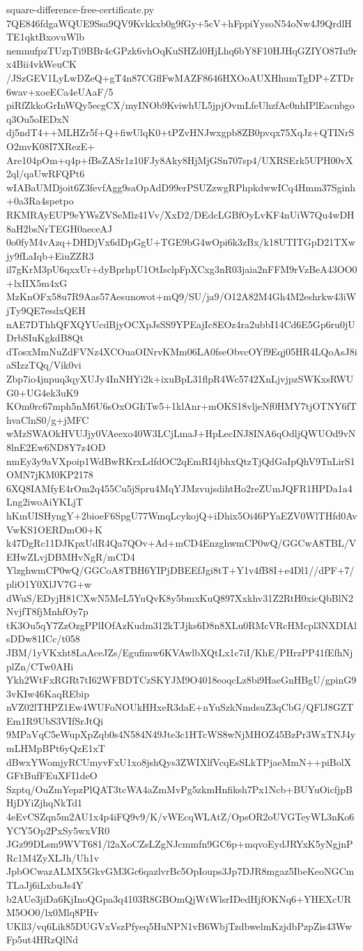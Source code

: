 \documentclass[11pt]{article}
\theoremstyle{definition}
\theoremstyle{remark}
\begin{document}
\begin{filecontents*}[overwrite]{square-difference-free-certificate.py}
7QE846fdgaWQUE9Ssa9QV9Kvkkxb0g9fGy+5cV+hFppiYysoN54oNw4J9QrdlHTE1qktBxovuWlb
nemnufpzTUzpTi9BBr4cGPzk6vhOqKuSHZd0HjLhq6bY8F10HJHqGZIYO87Iu9rx4Bii4vkWeuCK
/JSzGEV1LyLwDZeQ+gT4n87CGflFwMAZF8646HXOoAUXHhumTgDP+ZTDr6wav+xoeECa4eUAaF/5
piRfZkkoGrInWQy5ecgCX/myINOb9KviwhUL5jpjOvmLfeUhzfAc0nhIPlEacnbgoq3Ou5oIEDxN
dj5ndT4++MLHZr5f+Q+fiwUlqK0+tPZvHNJwxgpb8ZB0pvqx75XqJz+QTINrSO2mvK08I7XRezE+
Are104pOm+q4p+fBsZASr1z10FJy8Aky8HjMjGSn707sp4/UXRSErk5UPH00vX2ql/qaUwRFQPt6
wIABaUMDjoit6Z3fevfAgg9saOpAdD99erPSUZzwgRPhpkdwwICq4Hmm37Sginh+0a3Ra4spetpo
RKMRAyEUP9eYWsZVSeMlz41Vv/XxD2/DEdcLGBfOyLvKF4nUiW7Qu4wDH8aH2bsNrTEGH0aeceAJ
0o0fyM4vAzq+DHDjVx6dDpGgU+TGE9bG4wOpi6k3zBx/k18UTITGpD21TXwjy9fLaIqb+EiuZZR3
il7gKrM3pU6qxxUr+dyBprhpU1OtIsclpFpXCxg3nR03jaia2nFFM9rVzBeA43OO0+lxIIX5m4xG
MzKnOFx58u7R9Aas57Aesunowot+mQ9/SU/ja9/O12A82M4Gh4M2eshrkw43iWjTy9QE7esdxQEH
nAE7DThhQFXQYUcdBjyOCXpJsSS9YPEajIc8EOz4ra2ubbI14Cd6E5Gp6ru0jUDrbSIuKgkdB8Qt
dTosxMmNuZdFVNz4XCOuaOINrvKMm06LA0fseObvcOYf9Eqj05HR4LQoAsJ8iaSIzzTQq/Vik0vi
Zbp7io4jnpuq3qyXUJy4InNHYi2k+ixuBpL31flpR4Wc5742XnLjvjpzSWKxsRWUG0+UG4ek3uK9
KOm0rc67mph5nM6U6sOxOGIiTw5+1klAnr+mOKS18vljeNf0HMY7tjOTNY6fThvaClnS0/g+jMFC
wMzSWAOkHVUJjy0VAeexo40W3LCjLmaJ+HpLecINJ8INA6qOdljQWUOd9vN8lnE2Ew6ND8Y7z4OD
nmEy3y9aVXpoip1WdBwRKrxLdfdOC2qEmRI4jbhxQtzTjQdGaIpQhV9TnLirS1OMN7jKM0KP2178
6XQ8IAMfyE4rOm2q455Cu5jSpru4MqYJMzvujsdihtHo2reZUmJQFR1HPDa1a4Lng2iwoAiYKLjT
hKmUISHyngY+2bioeF6SpgU77WmqLcykojQ+iDhix5Oi46PYaEZV0WlTHfd0AvVwKS1OERDmO0+K
k47DgRc11DJKpxUdR4Qa7QOv+Ad+mCD4EnzghwmCP0wQ/GGCwA8TBL/VEHwZLvjDBMHvNgR/mCD4
YlzghwmCP0wQ/GGCoA8TBH6YIPjDBEEfJgi8tT+Y1v4fB8I+e4Dl1//dPF+7/pliO1Y0XlJV7G+w
dWuS/EDyjH81CXwN5MeL5YuQvK8y5bmxKuQ897Xxkhv31Z2RtH0xicQbBlN2NvjfT8fjMnhfOy7p
tK3Ou5qY7ZzOzgPPlIOfAzKudm312kTJjks6D8n8XLu0RMcVRcHMcpl3NXDIAlsDDw81ICc/t058
JBM/1yVKxht8LaAceJZs/Egufimw6KVAwlbXQtLx1c7iI/KhE/PHrzPP41fEfhNjplZn/CTw0AHi
Ykh2WtFxRGRt7tI62WFBDTCzSKYJM9O4018eoqcLz8bi9HaeGnHBgU/gpinG93vKIw46KaqREbip
nVZ02lTHPZ1Ew4WUFoNOUkHHxeR3daE+nYuSzkNmdsuZ3qCbG/QFlJ8GZTEm1R9UbS3VIfSrJtQi
9MPaVqC5eWupXpZqb0s4N584N49Jte3c1HTcWS8wNjMHOZ45BzPr3WxTNJ4ymLHMpBPt6yQzE1xT
dBwxYWomjyRCUmyvFxU1xo8jshQys3ZWIXlfVcqEsSLkTPjaeMmN++piBolXGFtBufFEuXFI1deO
Szptq/OuZmYepzPlQAT3tcWA4aZmMvPg5zkmHnfiksh7Px1Ncb+BUYuOicfjpBHjDYiZjhqNkTd1
4eEvCSZqn5m2AU1x4p4iFQ9v9/K/vWEcqWLAtZ/OpsOR2oUVGTeyWL3nKo6YCY5Op2PxSy5wxVR0
JGz99DLsm9WVT681/l2aXoCZsLZgNJcmmfn9GC6p+mqvoEydJRYxK5yNgjnPRc1M4ZyXLJh/Uh1v
JpbOCwazALMX5GkvGM3Gc6qazlvrBc5OpIoups3Jp7DJR8mgaz5IbeKeoNGCmTLaJj6iLxbuJs4Y
b2AUe3jiDa6KjInoQGpa3q4103R8GBOmQjWtWlsrIDedHjfOKNq6+YHEXcURM5OO0/lx0Mlq8PHv
UKll3/vq6Lik85DUGVxVszPfyeq5HuNPN1vB6WbjTzdbwelmKzjdbPzpZis43WwFp5ut4HRzQlNd

\end{filecontents*}
\end{document}

